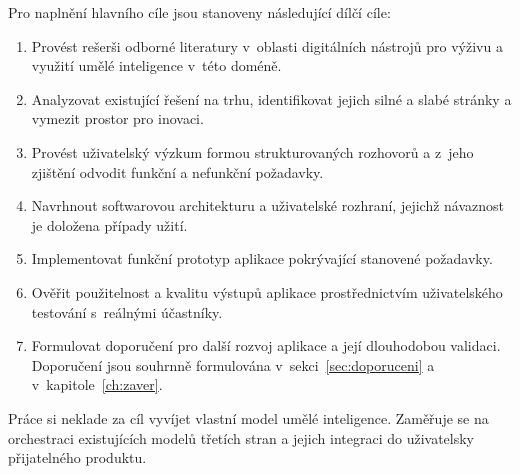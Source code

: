Pro naplnění hlavního cíle jsou stanoveny následující dílčí cíle:

\begin{enumerate}
	\item Provést rešerši odborné literatury v~oblasti digitálních nástrojů pro výživu a využití umělé inteligence v~této doméně.
	\item Analyzovat existující řešení na trhu, identifikovat jejich silné a slabé stránky a vymezit prostor pro inovaci.
	\item Provést uživatelský výzkum formou strukturovaných rozhovorů a z~jeho zjištění odvodit funkční a nefunkční požadavky.
	\item Navrhnout softwarovou architekturu a uživatelské rozhraní, jejichž návaznost je doložena případy užití.
	\item Implementovat funkční prototyp aplikace pokrývající stanovené požadavky.
	\item Ověřit použitelnost a kvalitu výstupů aplikace prostřednictvím uživatelského testování s~reálnými účastníky.
	\item Formulovat doporučení pro další rozvoj aplikace a její dlouhodobou validaci. Doporučení jsou souhrnně formulována v~sekci~\ref{sec:doporuceni} a v~kapitole~\ref{ch:zaver}.
\end{enumerate}

Práce si neklade za cíl vyvíjet vlastní model umělé inteligence.
Zaměřuje se na orchestraci existujících modelů třetích stran a jejich integraci do uživatelsky přijatelného produktu.

